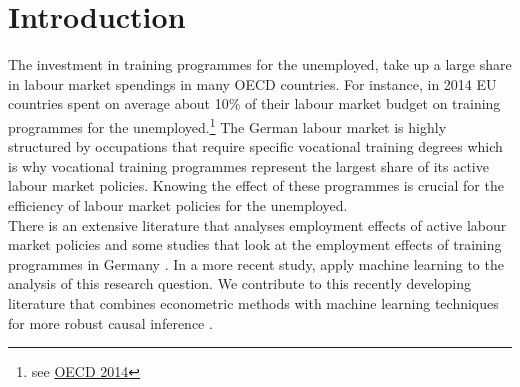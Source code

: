 \section{Introduction}

The investment in training programmes for the unemployed, take up a large share in labour market spendings in many OECD countries. For instance, in 2014 EU countries spent on average about 10\% of their labour market budget on training programmes for the unemployed.\footnote{see \href{https://data.oecd.org/socialexp/public-spending-on-labour-markets.htm}{OECD 2014}} The German labour market is highly structured by occupations that require specific vocational training degrees which is why vocational training programmes represent the largest share of its active labour market policies. Knowing the effect of these programmes is crucial for the efficiency of labour market policies for the unemployed.  \\
There is an extensive literature that analyses employment effects of active labour market policies \citep[see][for overviews]{Kluve2010, Card2017} and some studies that look at the employment effects of training programmes in Germany \citep{Huber2018,Kruppe2018}. In a more recent study, \citet{Knaus2017} apply machine learning to the analysis of this research question. We contribute to this recently developing literature that combines econometric methods with machine learning techniques for more robust causal inference \citep{Belloni2014,Athey2015,Athey2017}.\\




